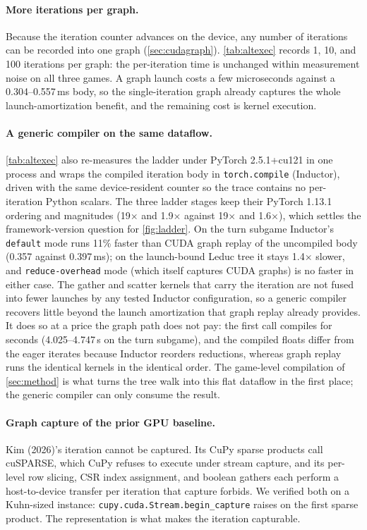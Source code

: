 \paragraph{More iterations per graph.}
Because the iteration counter advances on the device, any number of iterations can
be recorded into one graph (\cref{sec:cudagraph}). \cref{tab:altexec} records 1, 10,
and 100 iterations per graph: the per-iteration time is unchanged within
measurement noise on all three games. A graph launch costs a few microseconds
against a 0.304--0.557\,ms body, so the single-iteration graph already captures the
whole launch-amortization benefit, and the remaining cost is kernel execution.

\paragraph{A generic compiler on the same dataflow.}
\cref{tab:altexec} also re-measures the ladder under PyTorch 2.5.1+cu121 in one
process and wraps the compiled iteration body in \texttt{torch.compile} (Inductor),
driven with the same device-resident counter so the trace contains no per-iteration
Python scalars. The three ladder stages keep their PyTorch 1.13.1 ordering and magnitudes
(19$\times$ and 1.9$\times$ against 19$\times$ and 1.6$\times$), which settles the
framework-version question for \cref{fig:ladder}. On the turn subgame Inductor's
\texttt{default} mode runs 11\% faster than CUDA graph replay of the uncompiled body
(0.357 against 0.397\,ms); on the launch-bound Leduc tree it stays 1.4$\times$
slower, and \texttt{reduce-overhead} mode (which itself captures CUDA graphs) is no
faster in either case. The gather and scatter kernels that carry the iteration are
not fused into fewer launches by any tested Inductor configuration, so a generic compiler recovers little beyond the launch
amortization that graph replay already provides. It does so at a price the graph
path does not pay: the first call compiles for seconds (4.025--4.747\,s on the turn
subgame), and the compiled floats differ from the eager iterates because Inductor
reorders reductions, whereas graph replay runs the identical kernels in the
identical order. The game-level compilation of
\cref{sec:method} is what turns the tree walk into this flat dataflow in the first
place; the generic compiler can only consume the result.

\paragraph{Graph capture of the prior GPU baseline.}
Kim (2026)'s iteration cannot be captured. Its CuPy sparse products call cuSPARSE,
which CuPy refuses to execute under stream capture, and its per-level row slicing,
CSR index assignment, and boolean gathers each perform a host-to-device transfer per
iteration that capture forbids. We verified both on a Kuhn-sized instance:
\texttt{cupy.cuda.Stream.begin\_capture} raises on the first sparse product. The
representation is what makes the iteration capturable.

